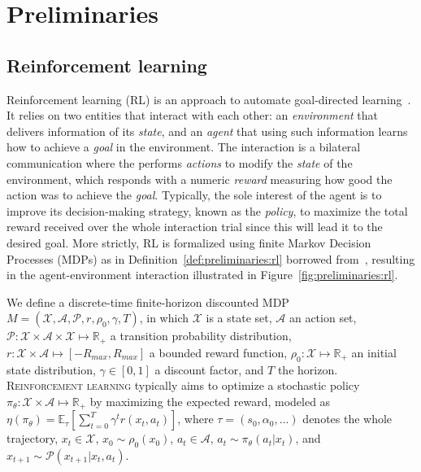 \section{Preliminaries}\label{sec:preliminaries}

\subsection{Reinforcement learning}\label{sec:preliminaries:rl}

Reinforcement learning (RL) is an approach to automate goal-directed learning~\citep{RLIntroBook}. It relies on two entities that interact with each other: an \textit{environment} that delivers information of its \textit{state}, and an \textit{agent} that using such information learns how to achieve a \textit{goal} in the environment. The interaction is a bilateral communication where the  performs \textit{actions} to modify the \textit{state} of the environment, which responds with a numeric \textit{reward} measuring how good the action was to achieve the \textit{goal}. Typically, the sole interest of the agent is to improve its decision-making strategy, known as the \textit{policy}, to maximize the total reward received over the whole interaction trial since this will lead it to the desired goal. More strictly, RL is formalized using finite Markov Decision Processes (MDPs) as in Definition~\ref{def:preliminaries:rl} borrowed from~\cite{RL2}, resulting in the agent-environment interaction illustrated in Figure~\ref{fig:preliminaries:rl}.


\begin{definition}
\label{def:preliminaries:rl}
We define a discrete-time finite-horizon discounted MDP $M = (\mathcal{X}, \mathcal{A}, \mathcal{P}, r, \rho_0, \gamma, T)$, in which $\mathcal{X}$ is a state set, $\mathcal{A}$ an action set, $\mathcal{P}: \mathcal{X} \times \mathcal{A} \times \mathcal{X} \mapsto \mathbb{R}_+$ a transition probability distribution, $r: \mathcal{X} \times \mathcal{A} \mapsto [-R_{max}, R_{max}]$ a bounded reward function, $\rho_0 : \mathcal{X} \mapsto \mathbb{R}_+ $ an initial state distribution, $\gamma \in [0,1]$ a discount factor, and $T$ the horizon.
\textsc{Reinforcement learning} typically aims to optimize a stochastic policy $\pi_\theta : \mathcal{X} \times \mathcal{A} \mapsto \mathbb{R}_+$ by maximizing the expected reward, modeled as $\eta(\pi_\theta) = \mathbb{E}_\tau[\sum_{t=0}^{T}{\gamma^tr(x_t, a_t)}]$, where $\tau = (s_0, \alpha_0, ...)$ denotes the whole trajectory, $x_t \in \mathcal{X}$, $x_0 \sim \rho_0(x_0)$, $a_t \in \mathcal{A}$, $a_t \sim \pi_\theta(a_t | x_t)$, and $x_{t+1} \sim \mathcal{P}(x_{t+1}| x_t, a_t)$.

\end{definition}

